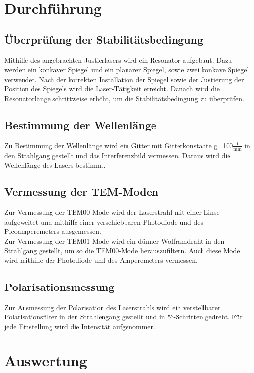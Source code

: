 \documentclass[]{scrartcl}
\begin{document}
\section{Durchführung}

\subsection{Überprüfung der Stabilitätsbedingung}
Mithilfe des angebrachten Justierlasers wird ein Resonator aufgebaut. Dazu werden ein konkaver Spiegel und ein planarer Spiegel, sowie zwei konkave Spiegel verwendet. Nach der korrekten Installation der Spiegel sowie der Justierung der Position des Spiegels wird die Laser-Tätigkeit erreicht. Danach wird die Resonatorlänge schrittweise erhöht, um die Stabilitätsbedingung zu überprüfen.

\subsection{Bestimmung der Wellenlänge}
Zu Bestimmung der Wellenlänge wird ein Gitter mit Gitterkonstante g=100$\frac{1}{\si{\milli\metre}}$ in den Strahlgang gestellt und das Interferenzbild vermessen. Daraus wird die Wellenlänge des Lasers bestimmt.

\subsection{Vermessung der TEM-Moden}
Zur Vermessung der TEM00-Mode wird der Laserstrahl mit einer Linse aufgeweitet und mithilfe einer verschiebbaren Photodiode und des Picoamperemeters ausgemessen. \\
Zur Vermessung der TEM01-Mode wird ein dünner Wolframdraht in den Strahlgang gestellt, um so die TEM00-Mode herauszufiltern. Auch diese Mode wird mithilfe der Photodiode und des Amperemeters vermessen.

\subsection{Polarisationsmessung}
Zur Ausmessung der Polarisation des Laserstrahls wird ein verstellbarer Polarisationsfilter in den Strahlengang gestellt und in $\ang{5}$-Schritten gedreht. Für jede Einstellung wird die Intensität aufgenommen.

\section{Auswertung}
\end{document}
